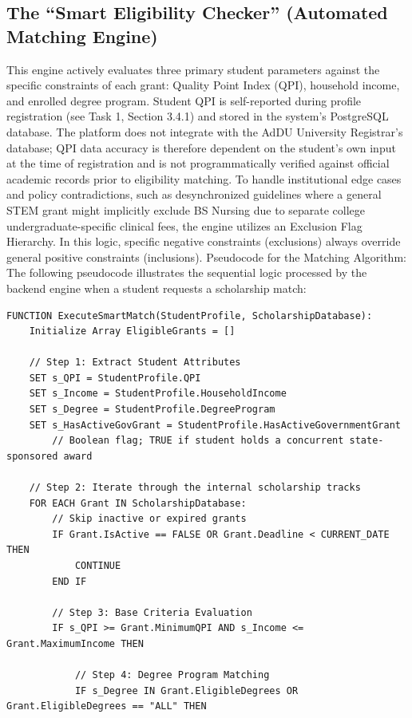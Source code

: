 \subsection{The ``Smart Eligibility Checker'' (Automated Matching Engine)}

This engine actively evaluates three primary student parameters against the specific constraints of each grant: Quality Point Index (QPI), household income, and enrolled degree program. Student QPI is self-reported during profile registration (see Task 1, Section 3.4.1) and stored in the system's PostgreSQL database. The platform does not integrate with the AdDU University Registrar's database; QPI data accuracy is therefore dependent on the student's own input at the time of registration and is not programmatically verified against official academic records prior to eligibility matching. To handle institutional edge cases and policy contradictions, such as desynchronized guidelines where a general STEM grant might implicitly exclude BS Nursing due to separate college undergraduate-specific clinical fees, the engine utilizes an Exclusion Flag Hierarchy. In this logic, specific negative constraints (exclusions) always override general positive constraints (inclusions). Pseudocode for the Matching Algorithm: The following pseudocode illustrates the sequential logic processed by the backend engine when a student requests a scholarship match: \begin{lstlisting}[caption={Pseudocode of the Smart Eligibility Checker matching algorithm},label={lst:matching}]
FUNCTION ExecuteSmartMatch(StudentProfile, ScholarshipDatabase):
    Initialize Array EligibleGrants = []

    // Step 1: Extract Student Attributes
    SET s_QPI = StudentProfile.QPI
    SET s_Income = StudentProfile.HouseholdIncome
    SET s_Degree = StudentProfile.DegreeProgram
    SET s_HasActiveGovGrant = StudentProfile.HasActiveGovernmentGrant
        // Boolean flag; TRUE if student holds a concurrent state-sponsored award

    // Step 2: Iterate through the internal scholarship tracks
    FOR EACH Grant IN ScholarshipDatabase:
        // Skip inactive or expired grants
        IF Grant.IsActive == FALSE OR Grant.Deadline < CURRENT_DATE THEN
            CONTINUE
        END IF

        // Step 3: Base Criteria Evaluation
        IF s_QPI >= Grant.MinimumQPI AND s_Income <= Grant.MaximumIncome THEN

            // Step 4: Degree Program Matching
            IF s_Degree IN Grant.EligibleDegrees OR Grant.EligibleDegrees == "ALL" THEN


\end{lstlisting}
